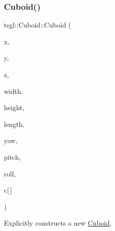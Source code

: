 \subsubsection{\texorpdfstring{Cuboid()}{Cuboid()}\hspace{0.1cm}{\footnotesize\ttfamily [2/2]}}
{\footnotesize\ttfamily tsgl\+::\+Cuboid\+::\+Cuboid (\begin{DoxyParamCaption}\item[{float}]{x,  }\item[{float}]{y,  }\item[{float}]{z,  }\item[{G\+Lfloat}]{width,  }\item[{G\+Lfloat}]{height,  }\item[{G\+Lfloat}]{length,  }\item[{float}]{yaw,  }\item[{float}]{pitch,  }\item[{float}]{roll,  }\item[{\hyperlink{structtsgl_1_1_color_float}{Color\+Float}}]{c\mbox{[}$\,$\mbox{]} }\end{DoxyParamCaption})}



Explicitly constructs a new \hyperlink{classtsgl_1_1_cuboid}{Cuboid}. 

